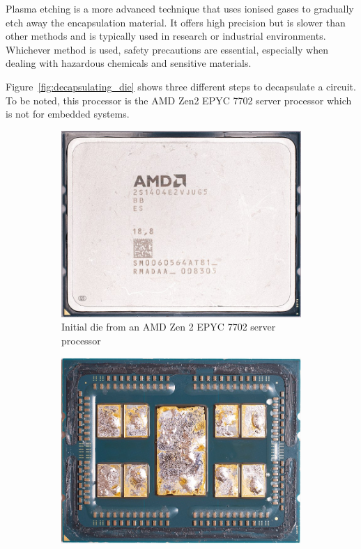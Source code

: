 Plasma etching is a more advanced technique that uses ionised gases to gradually etch away the encapsulation material. It offers high precision but is slower than other methods and is typically used in research or industrial environments. Whichever method is used, safety precautions are essential, especially when dealing with hazardous chemicals and sensitive materials.

Figure~\ref{fig:decapsulating_die} shows three different steps to decapsulate a circuit. To be noted, this processor is the AMD Zen2 EPYC 7702 server processor which is not for embedded systems.

\begin{figure}[ht]
    \centering
    \begin{subfigure}[b]{0.3\textwidth}
        \includegraphics[width=\textwidth]{c2_soa/img/epyc_7702_initial.jpg}
        \caption{Initial die from an AMD Zen 2 EPYC 7702 server processor}
        \label{fig:initial_die}
    \end{subfigure}
    \hfill
    \begin{subfigure}[b]{0.3\textwidth}
        \includegraphics[width=\textwidth]{c2_soa/img/epyc_7702_delidding.jpg}

\end{subfigure}
\end{figure}
